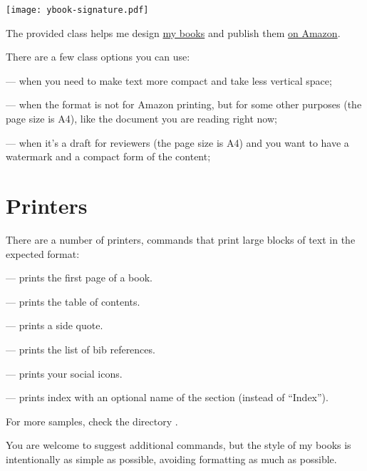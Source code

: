 \documentclass[compact,manuscript]{./ybook}
\begin{document}
\texttt{[image: ybook-signature.pdf]}
\vspace*{24pt}

\maketitle

The provided class  helps me design
\href{https://www.yegor256.com/books.html}{my books} and
publish them
\href{https://www.amazon.com/Yegor-Bugayenko/e/B01AM1QMDK}{on Amazon}.

There are a few class options you can use:

 --- when you need to make text more compact
and take less vertical space;

 --- when the format is not for Amazon printing,
but for some other purposes (the page size is A4), like the document
you are reading right now;

 --- when it's a draft for reviewers (the page size is A4)
and you want to have a watermark and a compact form of the content;

\section*{Printers}

There are a number of printers, commands that print large blocks of text
in the expected format:

 --- prints the first page of a book.

 --- prints the table of contents.

 --- prints a side quote.

 --- prints the list of bib references.

 --- prints your social icons.

 --- prints index with an optional name of the section (instead of ``Index'').

For more samples, check the directory .

You are welcome to suggest additional commands, but the style
of my books is intentionally as simple as possible, avoiding formatting
as much as possible.
\end{document}
